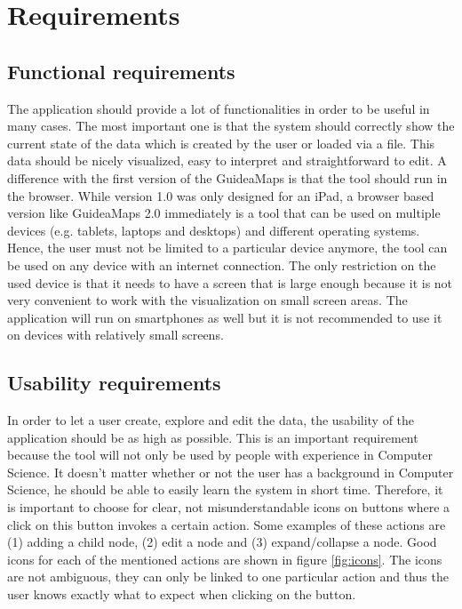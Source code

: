\chapter{Requirements}\label{ch:requirements}

\section{Functional requirements}\label{sec:functional-requirements}
The application should provide a lot of functionalities in order to be useful in many cases. The most important one is that the system should correctly show the current state of the data which is created by the user or loaded via a file. This data should be nicely visualized, easy to interpret and straightforward to edit. A difference with the first version of the GuideaMaps is that the tool should run in the browser. While version 1.0 was only designed for an iPad, a browser based version like GuideaMaps 2.0 immediately is a tool that can be used on multiple devices (e.g. tablets, laptops and desktops) and different operating systems. Hence, the user must not be limited to a particular device anymore, the tool can be used on any device with an internet connection. The only restriction on the used device is that it needs to have a screen that is large enough because it is not very convenient to work with the visualization on small screen areas. The application will run on smartphones as well but it is not recommended to use it on devices with relatively small screens. 

\section{Usability requirements}\label{sec:usability-requirements}
In order to let a user create, explore and edit the data, the usability of the application should be as high as possible. This is an important requirement because the tool will not only be used by people with experience in Computer Science. It doesn't matter whether or not the user has a background in Computer Science, he should be able to easily learn the system in short time. Therefore, it is important to choose for clear, not misunderstandable icons on buttons where a click on this button invokes a certain action. Some examples of these actions are (1) adding a child node, (2) edit a node and (3) expand/collapse a node. Good icons for each of the mentioned actions are shown in figure \ref{fig:icons}. The icons are not ambiguous, they can only be linked to one particular action and thus the user knows exactly what to expect when clicking on the button.

